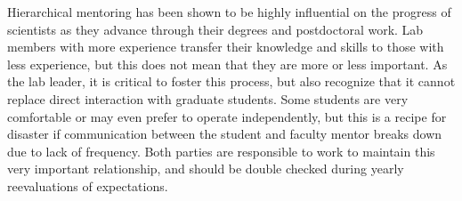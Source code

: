 \documentclass[11pt]{article}
\begin{document}
Hierarchical mentoring has been shown to be highly influential on the progress of scientists as they advance through their degrees and postdoctoral work. Lab members with more experience transfer their knowledge and skills to those with less experience, but this does not mean that they are more or less important. As the lab leader, it is critical to foster this process, but also recognize that it cannot replace direct interaction with graduate students. Some students are very comfortable or may even prefer to operate independently, but this is a recipe for disaster if communication between the student and faculty mentor breaks down due to lack of frequency. Both parties are responsible to work to maintain this very important relationship, and should be double checked during yearly reevaluations of expectations.












\end{document}
